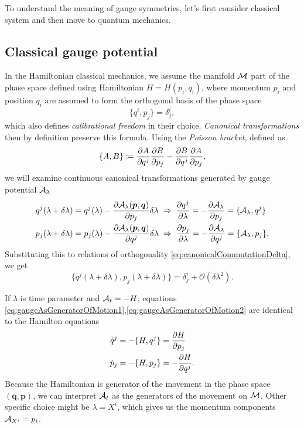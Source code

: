  To understand the meaning of gauge symmetries, let's first consider classical system and then move to quantum mechanics.


\subsection{Classical gauge potential}



In the Hamiltonian classical mechanics, we assume the manifold $\mathcal{M}$ part of the phase space defined using Hamiltonian $H=H(p_i,q_i)$, where momentum $p_i$ and position $q_i$ are assumed to form the orthogonal basis of the phase space
\begin{equation}
    \{q^i,p_j\}=\delta^i_j,
    \label{eq:canonicalCommutationDelta}
\end{equation}
which also defines \emph{calibrational freedom} in their choice. \emph{Canonical transformations} then by definition preserve this formula. Using the \emph{Poisson bracket}, defined as
\begin{equation}
    \{A,B\}\coloneqq \frac{\partial A}{\partial q^j}\frac{\partial B}{\partial p_j}-\frac{\partial B}{\partial q^j}\frac{\partial A}{\partial p_j},
\end{equation}
we will examine continuous canonical transformations generated by gauge potential $\mathcal{A}_\lambda$
\begin{align}
        q^j(\lambda+\delta\lambda)&=q^j(\lambda)-\frac{\partial \mathcal{A}_\lambda(\bm{p},\bm{q})}{\partial p_j}\delta\lambda \;\Rightarrow\; \frac{\partial q^j}{\partial \lambda}=-\frac{\partial \mathcal{A}_\lambda}{\partial p_j}=\{\mathcal{A}_\lambda,q^j\}
        \label{eq:gaugeAsGeneratorOfMotion1}\\
        p_j(\lambda+\delta\lambda)&=p_j(\lambda)-\frac{\partial \mathcal{A}_\lambda(\bm{p},\bm{q})}{\partial q^j}\delta\lambda \;\Rightarrow\; \frac{\partial p_j}{\partial \lambda}=-\frac{\partial \mathcal{A}_\lambda}{\partial q^j}=\{\mathcal{A}_\lambda,p_j\}.
        \label{eq:gaugeAsGeneratorOfMotion2}
\end{align}
Substituting this to relations of orthogonality \ref{eq:canonicalCommutationDelta}, we get
\begin{equation}
    \{q^j(\lambda+\delta\lambda),p_j(\lambda+\delta\lambda)\}=\delta^i_j + \mathcal{O}(\delta\lambda^2).
\end{equation}
 
If $\lambda$ is time parameter and $\mathcal{A}_t=-H$, equations \ref{eq:gaugeAsGeneratorOfMotion1},\ref{eq:gaugeAsGeneratorOfMotion2} are identical to the Hamilton equations
\begin{equation}
\begin{split}
    \dot{q}^j&=-\{H,q^j\} = \frac{\partial H}{\partial p_j}\\
    \dot{p}_j&=-\{H,p_j\} = -\frac{\partial H}{\partial q^j}.
\end{split}
\end{equation}
Because the Hamiltonian is generator of the movement in the phase space $(\bm{q},\bm{p})$, we can interpret $\mathcal{A}_t$ as the generators of the movement on $\mathcal{M}$. Other specific choice might be $\lambda=X^i$, which gives us the momentum components $\mathcal{A}_{X^i}=p_i$.

